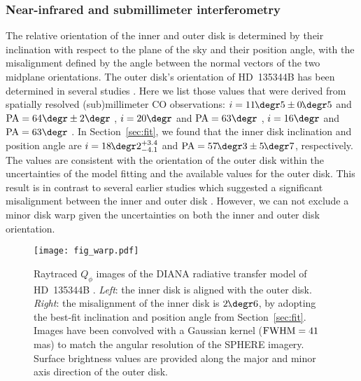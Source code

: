 \documentclass[twocolumn,tighten]{aastex61}
\newcommand{\ffdeg}{\mbox{\ensuremath{.\!\!\degr}}}
\begin{document}
\subsubsection{Near-infrared and submillimeter interferometry}\label{sec:interferometry_constraints}

The relative orientation of the inner and outer disk is determined by their inclination with respect to the plane of the sky and their position angle, with the misalignment defined by the angle between the normal vectors of the two midplane orientations. The outer disk's orientation of HD~135344B has been determined in several studies \citep[see][for an overview]{carmona2014}. Here we list those values that were derived from spatially resolved (sub)millimeter CO observations: $i=11\ffdeg5\pm0\ffdeg5$ and ${\rm PA}=64\degr\pm2\degr$ \citep{lyo2011}, $i=20\degr$ and ${\rm PA}=63\degr$ \citep{vandermarel2015}, $i=16\degr$ and ${\rm PA}=63\degr$ \citep{vandermarel2016}. In Section~\ref{sec:fit}, we found that the inner disk inclination and position angle are $i = 18\ffdeg2^{+3.4}_{-4.1}$ and ${\rm PA} = 57\ffdeg3 \pm 5\ffdeg7$, respectively. The values are consistent with the orientation of the outer disk within the uncertainties of the model fitting and the available values for the outer disk. This result is in contrast to several earlier studies which suggested a significant misalignment between the inner and outer disk \citep{fedele2008,grady2009,stolker2016}. However, we can not exclude a minor disk warp given the uncertainties on both the inner and outer disk orientation.

\begin{figure*}
\centering
\texttt{[image: fig\_warp.pdf]}
\caption{Raytraced $Q_\phi$ images of the DIANA radiative transfer model of HD~135344B \citep{woitke2016}. \emph{Left}: the inner disk is aligned with the outer disk. \emph{Right}: the misalignment of the inner disk is $2\ffdeg6$, by adopting the best-fit inclination and position angle from Section~\ref{sec:fit}. Images have been convolved with a Gaussian kernel (${\rm FWHM} = 41$\,mas) to match the angular resolution of the SPHERE imagery. Surface brightness values are provided along the major and minor axis direction of the outer disk.\label{fig:warp}}
\end{figure*}
\end{document}
